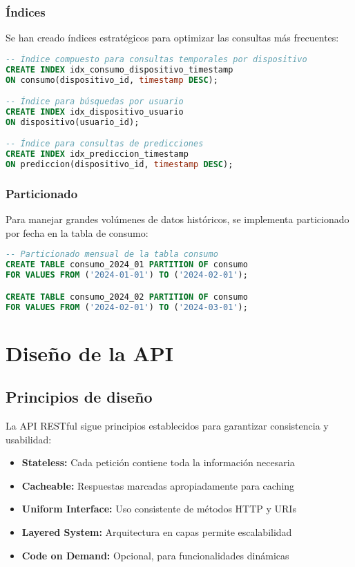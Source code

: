 \subsubsection{Índices}

Se han creado índices estratégicos para optimizar las consultas más frecuentes:

\begin{lstlisting}[language=SQL, caption=Índices de optimización]
-- Índice compuesto para consultas temporales por dispositivo
CREATE INDEX idx_consumo_dispositivo_timestamp 
ON consumo(dispositivo_id, timestamp DESC);

-- Índice para búsquedas por usuario
CREATE INDEX idx_dispositivo_usuario 
ON dispositivo(usuario_id);

-- Índice para consultas de predicciones
CREATE INDEX idx_prediccion_timestamp 
ON prediccion(dispositivo_id, timestamp DESC);
\end{lstlisting}

\subsubsection{Particionado}

Para manejar grandes volúmenes de datos históricos, se implementa particionado por fecha en la tabla de consumo:

\begin{lstlisting}[language=SQL, caption=Particionado de tabla consumo]
-- Particionado mensual de la tabla consumo
CREATE TABLE consumo_2024_01 PARTITION OF consumo
FOR VALUES FROM ('2024-01-01') TO ('2024-02-01');

CREATE TABLE consumo_2024_02 PARTITION OF consumo
FOR VALUES FROM ('2024-02-01') TO ('2024-03-01');
\end{lstlisting}

\section{Diseño de la API}

\subsection{Principios de diseño}

La API RESTful sigue principios establecidos para garantizar consistencia y usabilidad:

\begin{itemize}
    \item \textbf{Stateless:} Cada petición contiene toda la información necesaria
    \item \textbf{Cacheable:} Respuestas marcadas apropiadamente para caching
    \item \textbf{Uniform Interface:} Uso consistente de métodos HTTP y URIs
    \item \textbf{Layered System:} Arquitectura en capas permite escalabilidad
    \item \textbf{Code on Demand:} Opcional, para funcionalidades dinámicas
\end{itemize}

